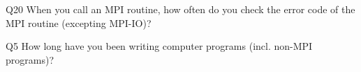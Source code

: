 \begin{description}%
\item{Q20} When you call an MPI routine, how often do you check the error code of the MPI routine  (excepting MPI-IO)?%
\item{Q5} How long have you been writing computer programs (incl. non-MPI programs)?%
\end{description}%
